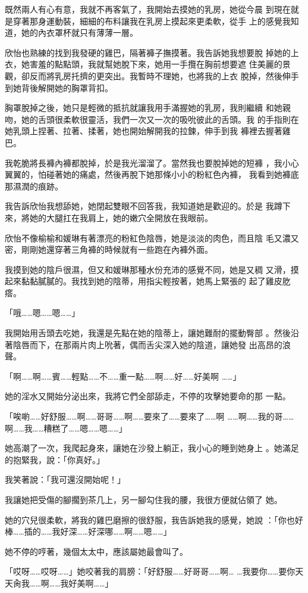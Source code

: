 既然兩人有心有意，我就不再客氣了，我開始去摸她的乳房，她從今晨
到現在就是穿著那身運動裝，細細的布料讓我在乳房上摸起來更柔軟，從手
上的感覺我知道，她的內衣罩杯就只有薄薄一層。

欣怡也熟練的找到我發硬的雞巴，隔著褲子撫摸著。我告訴她我想要脫
掉她的上衣，她害羞的點點頭，我就幫她脫下來，她用一手攬在胸前想要遮
住美麗的景觀，卻反而將乳房托擠的更突出。我暫時不理她，也將我的上衣
脫掉，然後伸手到她背後解開她的胸罩背扣。

胸罩脫掉之後，她只是輕微的抵抗就讓我用手滿握她的乳房，我則繼續
和她親吻，她的舌頭很柔軟很靈活，我們一次又一次的吸吮彼此的舌頭。我
的手指則在她乳頭上捏著、拉著、揉著，她也開始解開我的拉鍊，伸手到我
褲裡去握著雞巴。

我乾脆將長褲內褲都脫掉，於是我光溜溜了。當然我也要脫掉她的短褲
，我小心翼翼的，怕碰著她的痛處，然後再脫下她那條小小的粉紅色內褲，
我看到她褲底那濕潤的痕跡。

我告訴欣怡我想舔她，她閉起雙眼不回答我，我知道她是歡迎的。於是
我蹲下來，將她的大腿扛在我肩上，她的嫩穴全開放在我眼前。

欣怡不像榆榆和媛琳有著漂亮的粉紅色陰唇，她是淡淡的肉色，而且陰
毛又濃又密，剛剛她還穿著三角褲的時候就有一些跑在內褲外面。

我摸到她的陰戶很濕，但又和媛琳那種水份充沛的感覺不同，她是又稠
又滑，摸起來黏黏膩膩的。我找到她的陰蒂，用指尖輕按著，她馬上緊張的
起了雞皮肐瘩。

「哦……嗯……嗯……」

我開始用舌頭去吃她，我還是先點在她的陰蒂上，讓她難耐的擺動臀部
。然後沿著陰唇而下，在那兩片肉上吮著，偶而舌尖深入她的陰道，讓她發
出高昂的浪聲。

「啊……啊……賓……輕點……不……重一點……啊……好……好美啊
……」

她的淫水又開始分泌出來，我將它們全部舔走，不停的攻擊她要命的那
一點。

「唉喲……好舒服……啊……哥哥……啊……要來了……要來了……啊
……啊……我的哥……啊……我……糟糕了……嗯……嗯……」

她高潮了一次，我爬起身來，讓她在沙發上躺正，我小心的睡到她身上
。她滿足的抱緊我，說：「你真好。」

我笑著說：「我可還沒開始呢！」

我讓她把受傷的腳擱到茶几上，另一腳勾住我的腰，我很方便就佔領了
她。

她的穴兒很柔軟，將我的雞巴磨擦的很舒服，我告訴她我的感覺，她說
：「你也好棒……插的……我好深……好深哪……啊……嗯……」

她不停的哼著，幾個太太中，應該屬她最會叫了。

「哎呀……哎呀……」她咬著我的肩膀：「好舒服……好哥哥……啊…
…我要你……要你天天肏我……啊……我好美啊……」

